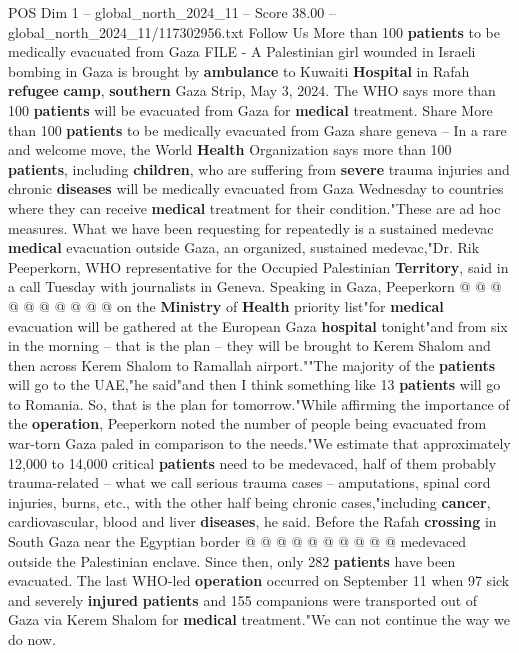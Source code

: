\begin{textsample}{POS Dim 1 – global\_north\_2024\_11 – Score 38.00 – global\_north\_2024\_11/117302956.txt}  \label{ex:f1_pos_334}
Follow Us More than 100 \textbf{patients} to be medically evacuated from Gaza FILE - A Palestinian girl wounded in Israeli bombing in Gaza is brought by \textbf{ambulance} to Kuwaiti \textbf{Hospital} in Rafah \textbf{refugee} \textbf{camp}, \textbf{southern} Gaza Strip, May 3, 2024.
The WHO says more than 100 \textbf{patients} will be evacuated from Gaza for \textbf{medical} treatment.
Share More than 100 \textbf{patients} to be medically evacuated from Gaza share geneva -- In a rare and welcome move, the World \textbf{Health} Organization says more than 100 \textbf{patients}, including \textbf{children}, who are suffering from \textbf{severe} trauma injuries and chronic \textbf{diseases} will be medically evacuated from Gaza Wednesday to countries where they can receive \textbf{medical} treatment for their condition."These are ad hoc measures.
What we have been requesting for repeatedly is a sustained medevac \textbf{medical} evacuation outside Gaza, an organized, sustained medevac,"Dr.
Rik Peeperkorn, WHO representative for the Occupied Palestinian \textbf{Territory}, said in a call Tuesday with journalists in Geneva.
Speaking in Gaza, Peeperkorn @ @ @ @ @ @ @ @ @ @ on the \textbf{Ministry} of \textbf{Health} priority list"for \textbf{medical} evacuation will be gathered at the European Gaza \textbf{hospital} tonight"and from six in the morning -- that is the plan -- they will be brought to Kerem Shalom and then across Kerem Shalom to Ramallah airport.""The majority of the \textbf{patients} will go to the UAE,"he said"and then I think something like 13 \textbf{patients} will go to Romania.
So, that is the plan for tomorrow."While affirming the importance of the \textbf{operation}, Peeperkorn noted the number of people being evacuated from war-torn Gaza paled in comparison to the needs."We estimate that approximately 12,000 to 14,000 critical \textbf{patients} need to be medevaced, half of them probably trauma-related -- what we call serious trauma cases -- amputations, spinal cord injuries, burns, etc., with the other half being chronic cases,"including \textbf{cancer}, cardiovascular, blood and liver \textbf{diseases}, he said.
Before the Rafah \textbf{crossing} in South Gaza near the Egyptian border @ @ @ @ @ @ @ @ @ @ medevaced outside the Palestinian enclave.
Since then, only 282 \textbf{patients} have been evacuated.
The last WHO-led \textbf{operation} occurred on September 11 when 97 sick and severely \textbf{injured} \textbf{patients} and 155 companions were transported out of Gaza via Kerem Shalom for \textbf{medical} treatment."We can not continue the way we do now.

\end{textsample}
